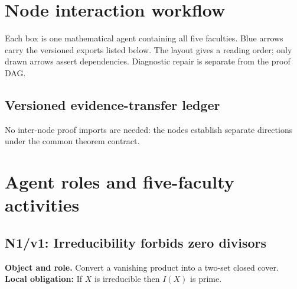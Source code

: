 \documentclass[preprint,12pt,aps,pra,showkeys,amsmath,amssymb,superscriptaddress,floatfix]{revtex4-2}
\theoremstyle{definition}
\theoremstyle{remark}
\newcommand{\field}[2]{\par\smallskip\noindent\textbf{#1.} #2\par}
\begin{document}
\clearpage\section{Node interaction workflow}

\begin{center}\end{center}

Each box is one mathematical agent containing all five faculties. Blue
arrows carry the versioned exports listed below. The layout gives a
reading order; only drawn arrows assert dependencies. Diagnostic repair
is separate from the proof DAG.

\subsection{Versioned evidence-transfer ledger}
No inter-node proof imports are needed: the nodes establish separate directions under the common theorem contract.


\begingroup\small\linespread{1.05}\selectfont

\endgroup

\clearpage\section{Agent roles and five-faculty activities}\begingroup\small\linespread{1.05}\selectfont{}

\subsection{N1/v1: Irreducibility forbids zero divisors}

\field{Object and role}{Convert a vanishing product into a two-set closed cover. \textbf{Local
obligation:} If \(X\) is irreducible then \(I(X)\) is prime.}
\end{document}
